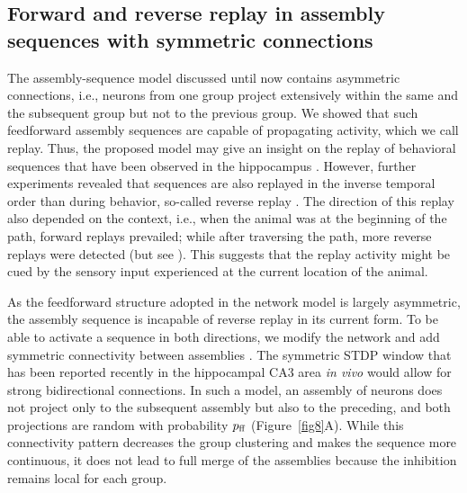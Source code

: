   \subsection{Forward and reverse replay in assembly sequences with symmetric connections}
    The assembly-sequence model discussed until now contains asymmetric
    connections, i.e., neurons from one group project extensively within the
    same and the subsequent group but not to the previous group. We showed that
    such feedforward assembly sequences are capable of propagating activity,
    which we call replay. Thus, the proposed model may give an insight on the
    replay of behavioral sequences that have been observed in the hippocampus
    \citep{Lee2002}. However, further experiments revealed that sequences are
    also replayed in the inverse temporal order than during behavior, so-called
    reverse replay \citep{Foster2006, Diba2007}. The direction of this replay
    also depended on the context, i.e., when the animal was at the beginning of
    the path, forward replays prevailed; while after traversing the path, more
    reverse replays were detected (but see \citealp{Karlsson2009}). This suggests
    that the replay activity might be cued by the sensory input experienced at
    the current location of the animal.

    As the feedforward structure adopted in the network model is largely
    asymmetric, the assembly sequence is incapable of reverse replay in its
    current form. To be able to activate a sequence in both directions, we
    modify the network and add symmetric connectivity between assemblies
    \citep{Litwin2014, Sadeh2015}. The symmetric STDP window that has been
    reported recently in the hippocampal CA3 area \textit{in vivo}
    \citep{Mishra2016} would allow for strong bidirectional connections. In such
    a model, an assembly of neurons does not project only to the subsequent
    assembly but also to the preceding, and both projections are random with
    probability $p_{\rm ff}$ (Figure~\ref{fig8}A). While this connectivity pattern
    decreases the group clustering and makes the sequence more continuous, it
    does not lead to full merge of the assemblies because the inhibition
    remains local for each group.

